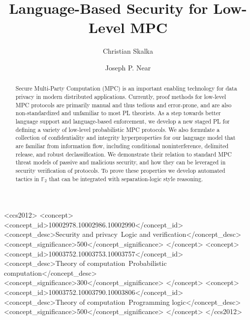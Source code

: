 \documentclass[sigconf]{acmart}
\begin{document}
\title{Language-Based Security for Low-Level MPC}

\author{Christian Skalka}

\author{Joseph P. Near}

\begin{abstract}
  Secure Multi-Party Computation (MPC) is an important
  enabling technology for data privacy in modern distributed
  applications. Currently, proof methods for low-level MPC protocols
  are primarily manual and thus tedious and error-prone, and are also
  non-standardized and unfamiliar to most PL theorists. As a step
  towards better language support and language-based enforcement, we
  develop a new staged PL for defining a variety of low-level
  probabilistic MPC protocols. We also formulate a collection of
  confidentiality and integrity hyperproperties for our language model
  that are familiar from information flow, including conditional
  noninterference, delimited release, and robust declassification. We
  demonstrate their relation to standard MPC threat models of passive
  and malicious security, and how they can be leveraged in security
  verification of protocols. To prove these properties we develop
  automated tactics in $\mathbb{F}_2$ that can be integrated with
  separation-logic style reasoning.
\end{abstract}

\begin{CCSXML}
<ccs2012>
   <concept>
       <concept_id>10002978.10002986.10002990</concept_id>
       <concept_desc>Security and privacy~Logic and verification</concept_desc>
       <concept_significance>500</concept_significance>
       </concept>
   <concept>
       <concept_id>10003752.10003753.10003757</concept_id>
       <concept_desc>Theory of computation~Probabilistic computation</concept_desc>
       <concept_significance>300</concept_significance>
       </concept>
   <concept>
       <concept_id>10003752.10003790.10003806</concept_id>
       <concept_desc>Theory of computation~Programming logic</concept_desc>
       <concept_significance>500</concept_significance>
       </concept>
 </ccs2012>
\end{CCSXML}
\end{document}
